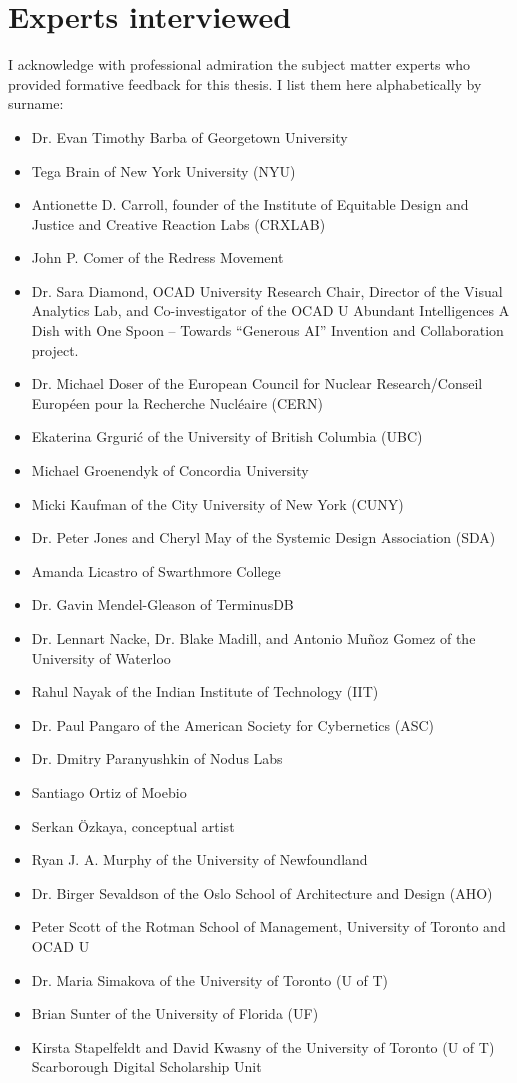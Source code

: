 \section{Experts interviewed}
I acknowledge with professional admiration the subject matter experts who provided formative feedback for this thesis. I list them here alphabetically by surname:
\begin{itemize}
    \item Dr. Evan Timothy Barba of Georgetown University
    \item Tega Brain of New York University (NYU)
    \item Antionette D. Carroll, founder of the Institute of Equitable Design and Justice and Creative Reaction Labs (CRXLAB)
    \item John P. Comer of the Redress Movement
    \item Dr. Sara Diamond, OCAD University Research Chair, Director of the Visual Analytics Lab, and Co-investigator of the OCAD U Abundant Intelligences A Dish with One Spoon – Towards “Generous AI” Invention and Collaboration project.
    \item Dr. Michael Doser of the European Council for Nuclear Research/Conseil Européen pour la Recherche Nucléaire (CERN)
    \item Ekaterina Grgurić of the University of British Columbia (UBC)
    \item Michael Groenendyk of Concordia University
    \item Micki Kaufman of the City University of New York (CUNY)
    \item Dr. Peter Jones and Cheryl May of the Systemic Design Association (SDA)
    \item Amanda Licastro of Swarthmore College
    \item Dr. Gavin Mendel-Gleason of TerminusDB
    \item Dr. Lennart Nacke, Dr. Blake Madill, and Antonio Muñoz Gomez of the University of Waterloo
    \item Rahul Nayak of the Indian Institute of Technology (IIT)
    \item Dr. Paul Pangaro of the American Society for Cybernetics (ASC)
    \item Dr. Dmitry Paranyushkin of Nodus Labs
    \item Santiago Ortiz of Moebio
    \item Serkan Özkaya, conceptual artist
    \item Ryan J. A. Murphy of the University of Newfoundland
    \item Dr. Birger Sevaldson of the Oslo School of Architecture and Design (AHO)
    \item Peter Scott of the Rotman School of Management, University of Toronto and OCAD U
    \item Dr. Maria Simakova of the University of Toronto (U of T)
    \item Brian Sunter of the University of Florida (UF)
    \item Kirsta Stapelfeldt and David Kwasny of the University of Toronto (U of T) Scarborough Digital Scholarship Unit
\end{itemize}
\clearpage

